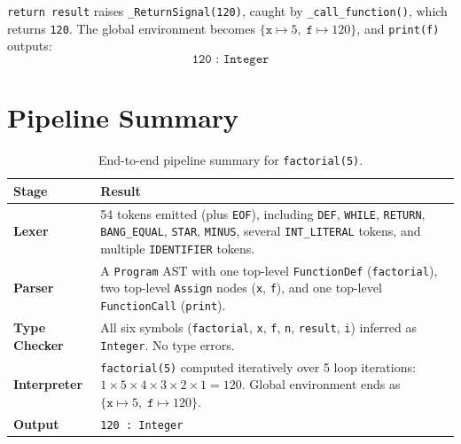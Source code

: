 \documentclass[11pt,a4paper]{article}
\begin{document}
\noindent \texttt{return result} raises \texttt{\_ReturnSignal(120)}, caught
by \texttt{\_call\_function()}, which returns \texttt{120}.
The global environment becomes
$\{\texttt{x} \mapsto 5,\;\texttt{f} \mapsto 120\}$, and
\texttt{print(f)} outputs:
\[
  \texttt{120 : Integer}
\]

\section{Pipeline Summary}

\begin{table}[H]
  \centering
  \caption{End-to-end pipeline summary for \texttt{factorial(5)}.}
  \label{tab:summary}
  \begin{tabular}{p{2.8cm}p{9.5cm}}
    \toprule
    \textbf{Stage} & \textbf{Result} \\
    \midrule
    \textbf{Lexer}
      & 54 tokens emitted (plus \texttt{EOF}), including \texttt{DEF}, \texttt{WHILE},
        \texttt{RETURN}, \texttt{BANG\_EQUAL}, \texttt{STAR},
        \texttt{MINUS}, several \texttt{INT\_LITERAL} tokens, and multiple
        \texttt{IDENTIFIER} tokens. \\[6pt]
    \textbf{Parser}
      & A \texttt{Program} AST with one top-level \texttt{FunctionDef}
        (\texttt{factorial}), two top-level \texttt{Assign} nodes
        (\texttt{x}, \texttt{f}), and one top-level
        \texttt{FunctionCall} (\texttt{print}). \\[6pt]
    \textbf{Type Checker}
      & All six symbols (\texttt{factorial}, \texttt{x}, \texttt{f},
        \texttt{n}, \texttt{result}, \texttt{i}) inferred as
        \texttt{Integer}.  No type errors. \\[6pt]
    \textbf{Interpreter}
      & \texttt{factorial(5)} computed iteratively over 5 loop
        iterations: $1 \!\times\! 5 \!\times\! 4 \!\times\! 3
        \!\times\! 2 \!\times\! 1 = 120$.
        Global environment ends as
        $\{\texttt{x}\!\mapsto\!5,\;\texttt{f}\!\mapsto\!120\}$. \\[6pt]
    \textbf{Output}
      & \texttt{120 : Integer} \\
    \bottomrule
  \end{tabular}
\end{table}
\end{document}
